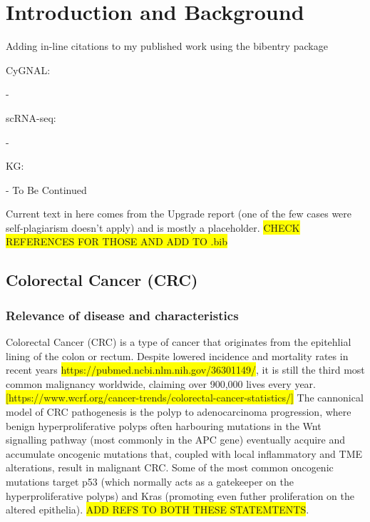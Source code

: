 \chapter{Introduction and Background}
\label{01intro}


Adding in-line citations to my published work using the bibentry package

CyGNAL:

- 

scRNA-seq:

- 

KG:

- To Be Continued


Current text in here comes from the Upgrade report (one of the few cases were self-plagiarism doesn't apply) and is mostly a placeholder.
\colorbox{yellow}{CHECK REFERENCES FOR THOSE AND ADD TO .bib}

\section{Colorectal Cancer (CRC)}

\subsection{Relevance of disease and characteristics}

Colorectal Cancer (CRC) is a type of cancer that originates from the epitehlial lining of the colon or rectum. Despite lowered incidence and mortality rates in recent years \colorbox{yellow}{https://pubmed.ncbi.nlm.nih.gov/36301149/}, it is still the third most common malignancy worldwide, claiming over 900,000 lives every year. \colorbox{yellow}{[https://www.wcrf.org/cancer-trends/colorectal-cancer-statistics/]}
The cannonical model of CRC pathogenesis is the polyp to adenocarcinoma progression, where benign hyperproliferative polyps often harbouring mutations in the Wnt signalling pathway (most commonly in the APC gene) eventually acquire and accumulate oncogenic mutations that, coupled with local inflammatory and TME alterations, result in malignant CRC. Some of the most common oncogenic mutations target p53 (which normally acts as a gatekeeper on the hyperproliferative polyps) and Kras (promoting even futher proliferation on the altered epithelia). \colorbox{yellow}{ADD REFS TO BOTH THESE STATEMTENTS}.

